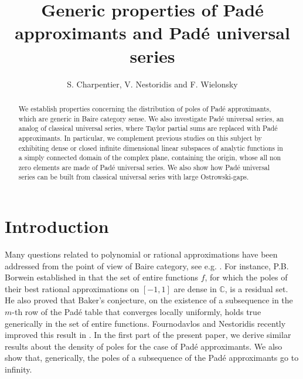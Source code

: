 \documentclass[12pt]{amsart}
\numberwithin{equation}{section}
\begin{document}
\title{Generic properties of Pad\'e approximants and Pad\'e universal series}
\author{S. Charpentier, V. Nestoridis and F. Wielonsky}
\address{St\'ephane Charpentier, 
Institut de Math\'ematiques de Marseille, UMR 7373, Aix-Marseille Universit\'e, Technop\^ole Ch\^ateau-Gombert, 39 rue F. Joliot Curie, 13453 Marseille Cedex 13, FRANCE}
\address{Vassili Nestoridis, 
Department of Mathematics, University of Athens Panepisitmioupolis, 15784 Athens, GREECE}
\address{Franck Wielonsky, 
Institut de Math\'ematiques de Marseille, UMR 7373, Aix-Marseille Universit\'e, Technop\^ole Ch\^ateau-Gombert, 39 rue F. Joliot Curie, 13453 Marseille Cedex 13, FRANCE}
\maketitle
\begin{abstract}
We establish properties concerning the distribution of poles of Pad\'e approximants, which are generic in Baire category sense. We also investigate
Pad\'e universal series, an analog of classical universal series, where Taylor partial sums are replaced with Pad\'e approximants. In particular, we complement previous studies on this subject by exhibiting dense or closed infinite dimensional linear subspaces of analytic functions in a simply connected domain of the complex plane, containing the origin, whose all non zero elements are made of Pad\'e universal series. We also show how Pad\'e universal series can be built from classical universal series with large Ostrowski-gaps.

\end{abstract}
\section{Introduction}
Many questions related to polynomial or rational approximations have been addressed from the point of view of Baire category, see e.g. \cite{Bar,Her,Her2,BOR,BOR2}. For instance, P.B. Borwein established in \cite{BOR} that the set 
of entire functions $f$, for which the poles of their best rational approximations on $[-1,1]$ are dense in ${\mathbb{C}}$, is a residual set.
He also proved that Baker's conjecture, on the existence of a subsequence in the $m$-th row of the Pad\'e table that converges locally uniformly, holds true generically in the set of entire functions.
Fournodavlos and Nestoridis recently improved this result 
in \cite{FNes}. In the first part of the present paper, we derive similar results about the density of poles for the case of Pad\'e approximants. We also show that, generically, the poles of a subsequence of the Pad\'e approximants go to infinity.
\end{document}
